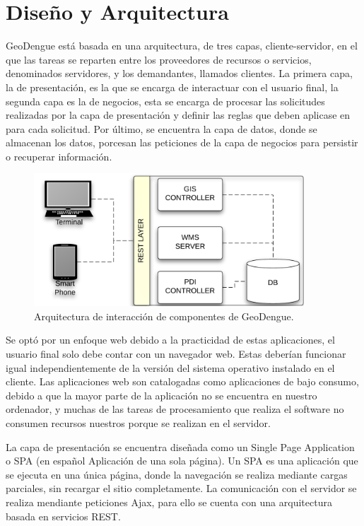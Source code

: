 \section{Diseño y Arquitectura}
GeoDengue está basada en una arquitectura, de tres capas, cliente-servidor, en el que las tareas
se reparten entre los proveedores de recursos o servicios, denominados servidores, y los
demandantes, llamados clientes. La primera capa, la de presentación, es la que se encarga de
interactuar con el usuario final, la segunda capa es la de negocios, esta se encarga de procesar
las solicitudes realizadas por la capa de presentación y definir las reglas que deben aplicase en
para cada solicitud. Por último, se encuentra la capa de datos, donde se almacenan los datos,
porcesan las peticiones de la capa de negocios para persistir o recuperar información.

\begin{figure}
\centering
\includegraphics[width=0.9\textwidth]{capitulo-5/graphics/arquitectura-completa.png}
\caption{\label{fig:arquitectura-completa}Arquitectura de interacción de componentes de GeoDengue.}
\end{figure}

Se optó por un enfoque web debido a la practicidad de estas aplicaciones, el usuario final solo
debe contar con un navegador web. Estas deberían funcionar igual independientemente de la versión
del sistema operativo instalado en el cliente. Las aplicaciones web son catalogadas como
aplicaciones de bajo consumo, debido a que la mayor parte de la aplicación no se encuentra en
nuestro ordenador, y muchas de las tareas de procesamiento que realiza el software no consumen
recursos nuestros porque se realizan en el servidor.

La capa de presentación se encuentra diseñada como un Single Page Application o SPA (en español
Aplicación de una sola página). Un SPA es una aplicación que se ejecuta en una única página, donde
la navegación se realiza mediante cargas parciales, sin recargar el sitio completamente. La
comunicación con el servidor se realiza mendiante peticiones Ajax, para ello se cuenta con una
arquitectura basada en servicios REST.

